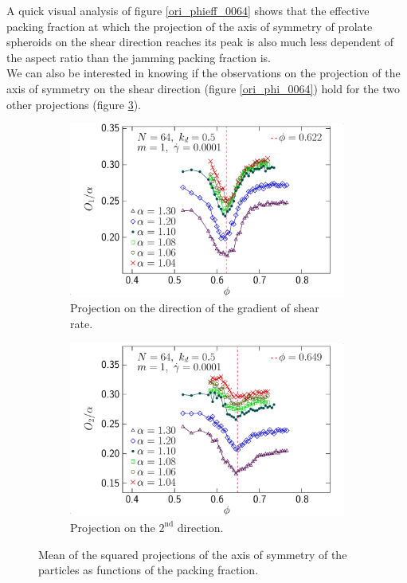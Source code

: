\documentclass[class=report, float=false, crop=false]{standalone}
\begin{document}
A quick visual analysis of figure \ref{ori_phieff_0064} shows that the effective packing fraction at which the projection of the axis of symmetry of prolate spheroids on the shear direction reaches its peak is also much less dependent of the aspect ratio than the jamming packing fraction is.\\

We can also be interested in knowing if the observations on the projection of the axis of symmetry on the shear direction (figure \ref{ori_phi_0064}) hold for the two other projections (figure \ref{ori12_phi_0064}).

\begin{figure}[h!]
\centering
    \begin{subfigure}[t]{0.49\textwidth}
        \centering
        \includegraphics[width=\textwidth]{figures/figs/ori1al_phi_0064_KDk500_Ml100_GDh100}
        \caption{Projection on the direction of the gradient of shear rate.}
        \label{ori1al_phi_0064_KDk500_Ml100_GDh100}
    \end{subfigure}
    \hfill
    \begin{subfigure}[t]{0.49\textwidth}
        \centering
        \includegraphics[width=\textwidth]{figures/figs/ori2al_phi_0064_KDk500_Ml100_GDh100}
        \caption{Projection on the $2^{\text{nd}}$ direction.}
        \label{ori2al_phi_0064_KDk500_Ml100_GDh100}
    \end{subfigure}
    \caption{Mean of the squared projections of the axis of symmetry of the particles as functions of the packing fraction.}
    \label{ori12_phi_0064}
\end{figure}
\end{document}
